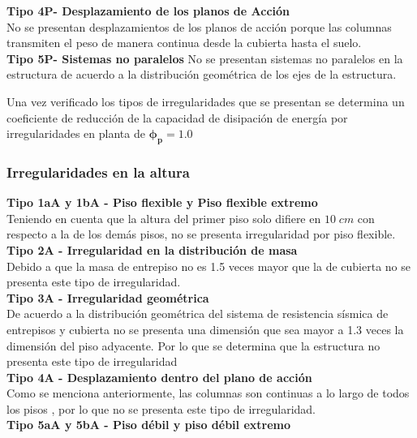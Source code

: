 \documentclass[12pt]{article}
\begin{document}
\textbf{Tipo 4P- Desplazamiento de los planos de Acción }\\
No se presentan desplazamientos de los planos de acción porque las columnas transmiten el peso de manera continua desde la cubierta hasta el suelo.\\

\textbf{Tipo 5P- Sistemas no paralelos}
No se presentan sistemas no paralelos en la estructura de acuerdo a la distribución geométrica de los ejes de la estructura.

Una vez verificado los tipos de irregularidades que se presentan se determina un coeficiente de reducción de la capacidad de disipación de energía por irregularidades en planta de $\mathbf{\phi_{p}=1.0}$

\subsubsection{Irregularidades en la altura}

\textbf{Tipo 1aA y 1bA - Piso flexible y Piso flexible extremo}\\
Teniendo en cuenta que la altura del primer piso solo difiere en $10\;cm$ con respecto a la de los demás pisos, no se presenta irregularidad por piso flexible.\\

\textbf{Tipo 2A - Irregularidad en la distribución de masa }\\
 Debido a que la masa de entrepiso no es 1.5 veces mayor que la de cubierta no se presenta este tipo de irregularidad.\\
 
 \textbf{Tipo 3A - Irregularidad geométrica}\\
 De acuerdo a la distribución geométrica del sistema de resistencia sísmica de entrepisos y cubierta no se presenta una dimensión que sea mayor a 1.3 veces  la dimensión del piso adyacente. Por lo que se determina que la estructura no presenta este tipo de irregularidad\\
 
 \textbf{Tipo 4A - Desplazamiento dentro del plano de acción}\\
 Como se menciona anteriormente, las columnas son continuas a lo largo de todos los pisos , por lo que no se presenta este tipo de irregularidad.\\
 
 \textbf{Tipo 5aA y 5bA - Piso débil y piso débil extremo}\\
 
\end{document}
